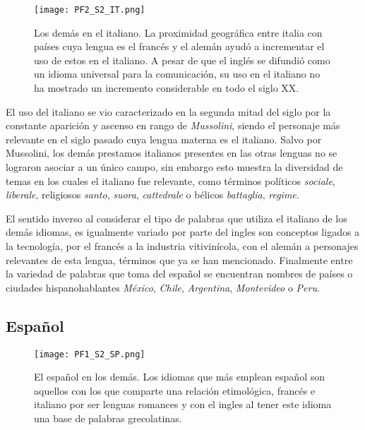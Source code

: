 \begin{figure}[h!]
	\centering
	\texttt{[image: PF2\_S2\_IT.png]}
	\label{fig.ST_b_IT}
	\caption{Los demás en el italiano. La proximidad geográfica  entre italia con países cuya lengua es el francés y el alemán ayudó a incrementar el uso de estos en el italiano. A pesar de que el inglés se difundió como un idioma universal para la comunicación, su uso en el italiano no ha mostrado un incremento considerable en todo el siglo XX. }
\end{figure}



El uso del italiano se vio caracterizado en la segunda mitad del siglo por la constante aparición y ascenso en rango de \textit{Mussolini}, siendo el personaje más relevante en el siglo pasado cuya lengua materna es el italiano.  Salvo por Mussolini, los demás prestamos italianos presentes en las otras lenguas no se lograron asociar a un único campo, sin embargo esto muestra la diversidad de temas en los cuales el italiano fue relevante, como términos políticos \textit{sociale}, \textit{liberale}, religiosos \textit{santo}, \textit{suora}, \textit{cattedrale} o  bélicos \textit{battaglia}, \textit{regime}.

El sentido inverso al considerar el tipo de palabras que utiliza el italiano de los demás idiomas, es igualmente variado por parte del ingles son conceptos ligados a la tecnología, por el francés a la industria vitivinícola, con el alemán a personajes relevantes de esta lengua,  términos que ya se han mencionado. Finalmente entre la variedad de palabras que toma del español se encuentran nombres de países o ciudades hispanohablantes \textit{México}, \textit{Chile}, \textit{Argentina}, \textit{Montevideo} o \textit{Peru}. 

\subsection{Español} %

\begin{figure}[h!] %
	\centering
	\texttt{[image: PF1\_S2\_SP.png]}
	\label{fig.ST_a_SP}
	\caption{El español en los demás. Los idiomas que más emplean español son aquellos con los que comparte una relación etimológica, francés e italiano por ser lenguas romances y con el ingles al tener este idioma una base de palabras grecolatinas.     }
\end{figure}


